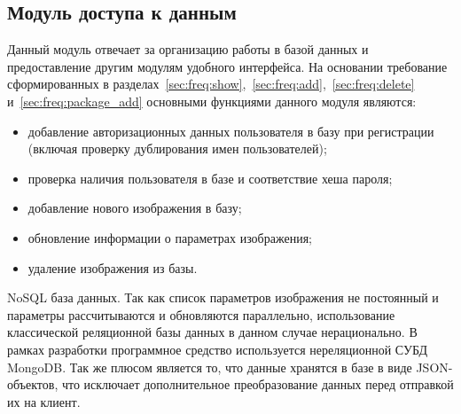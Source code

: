\subsection{Модуль доступа к данным}
Данный модуль отвечает за организацию работы в базой данных и предоставление другим модулям удобного интерфейса.
На основании требование сформированных в разделах~\ref{sec:freq:show},~\ref{sec:freq:add},~\ref{sec:freq:delete} и~\ref{sec:freq:package_add} основными функциями данного модуля являются:
\begin{itemize}
  \item добавление авторизационных данных пользователя в базу при регистрации (включая проверку дублирования имен пользователей);
  \item проверка наличия пользователя в базе и соответствие хеша пароля;
  \item добавление нового изображения в базу;
  \item обновление информации о параметрах изображения;
  \item удаление изображения из базы.
\end{itemize}

NoSQL база данных. Так как список параметров изображения не постоянный и параметры рассчитываются и обновляются параллельно, использование классической реляционной базы данных в данном случае нерационально. В рамках разработки программное средство используется нереляционной СУБД MongoDB. Так же плюсом является то, что данные хранятся в базе в виде JSON-объектов, что исключает дополнительное преобразование данных перед отправкой их на клиент.